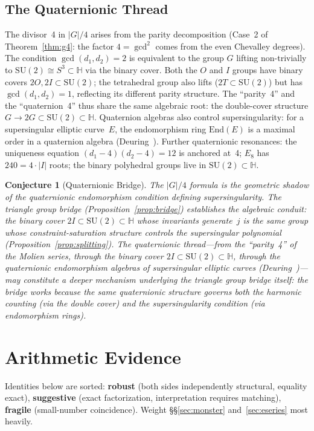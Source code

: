 \documentclass[11pt,letterpaper]{article}
\newtheorem{conjecture}[theorem]{Conjecture}
\theoremstyle{definition}
\newcommand{\HH}{\mathbb{H}}
\newcommand{\abs}[1]{\lvert #1 \rvert}
\begin{document}
\subsection{The Quaternionic Thread}\label{sec:quat}
The divisor~4 in $\abs{G}/4$ arises from the parity decomposition (Case~2 of Theorem~\ref{thm:g4}: the factor $4=\gcd^2$ comes from the even Chevalley degrees).  The condition $\gcd(d_1,d_2)=2$ is equivalent to the group $G$ lifting non-trivially to $\mathrm{SU}(2)\cong S^3\subset\HH$ via the binary cover.  Both the $O$ and $I$ groups have binary covers $2O,2I\subset\mathrm{SU}(2)$; the tetrahedral group also lifts ($2T\subset\mathrm{SU}(2)$) but has $\gcd(d_1,d_2)=1$, reflecting its different parity structure.
The ``parity~4'' and the ``quaternion~4'' thus share the same algebraic root: the double-cover structure $G\to 2G\subset\mathrm{SU}(2)\subset\HH$.  Quaternion algebras also control supersingularity: for a supersingular elliptic curve~$E$, the endomorphism ring $\mathrm{End}(E)$ is a maximal order in a quaternion algebra (Deuring~\cite{Deuring1941}).
Further quaternionic resonances: the uniqueness equation $(d_1{-}4)(d_2{-}4)=12$ is anchored at~4; $E_8$ has $240=4\cdot\abs{I}$ roots; the binary polyhedral groups live in $\mathrm{SU}(2)\subset\HH$.
\begin{conjecture}[Quaternionic Bridge]\label{conj:quat}
The $\abs{G}/4$ formula is the geometric shadow of the quaternionic endomorphism condition defining supersingularity.  The triangle group bridge (Proposition~\ref{prop:bridge}) establishes the algebraic conduit: the binary cover $2I\subset\mathrm{SU}(2)\subset\HH$ whose invariants generate~$j$ is the same group whose constraint-saturation structure controls the supersingular polynomial (Proposition~\ref{prop:splitting}).  The quaternionic thread---from the ``parity~4'' of the Molien series, through the binary cover $2I\subset\mathrm{SU}(2)\subset\HH$, through the quaternionic endomorphism algebras of supersingular elliptic curves (Deuring~\cite{Deuring1941})---may constitute a deeper mechanism underlying the triangle group bridge itself: the bridge works because the same quaternionic structure governs both the harmonic counting (via the double cover) and the supersingularity condition (via endomorphism rings).
\end{conjecture}
\section{Arithmetic Evidence}\label{sec:arith}
\begin{remarkbox}
Identities below are sorted: \textbf{robust} (both sides independently structural, equality exact), \textbf{suggestive} (exact factorization, interpretation requires matching), \textbf{fragile} (small-number coincidence).  Weight \S\S\ref{sec:monster} and~\ref{sec:eseries} most heavily.
\end{remarkbox}
\end{document}
